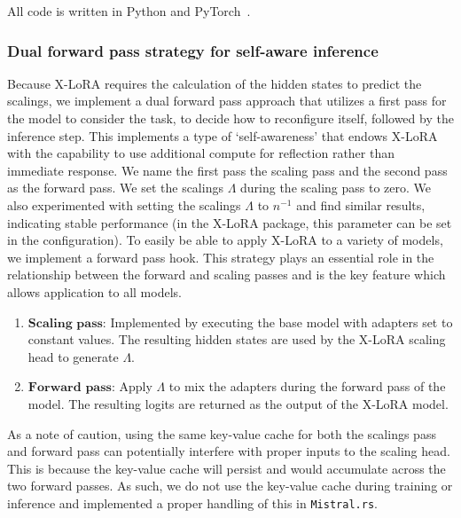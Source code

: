 \documentclass{article}
\begin{document}
All code is written in Python and PyTorch~\cite{Paszke2019PyTorchLibrary}. 


\subsubsection{Dual forward pass strategy for self-aware inference}
Because X-LoRA requires the calculation of the hidden states to predict the scalings, we implement a dual forward pass approach that utilizes a first pass for the model to consider the task, to decide how to reconfigure itself, followed by the inference step. This implements a type of `self-awareness' that endows X-LoRA with the capability to use additional compute for reflection rather than immediate response. 
%
We name the first pass the scaling pass and the second pass as the forward pass. We set the scalings $\Lambda$ during the scaling pass to zero. We  also experimented with setting the scalings $\Lambda$ to ${n}^{-1}$ and find similar results, indicating stable performance (in the X-LoRA package, this parameter can be set in the configuration). To easily be able to apply X-LoRA to a variety of models, we implement a forward pass hook. This strategy plays an essential role in the relationship between the forward and scaling passes and is the key feature which allows application to all models. 

\begin{enumerate}
    \item $\mathbf{Scaling}$ $\mathbf{pass}$: Implemented by executing the base model with adapters set to constant values. The resulting hidden states are used by the X-LoRA scaling head to generate $\Lambda$.
    \item $\mathbf{Forward}$ $\mathbf{pass}$: Apply $\Lambda$ to mix the adapters during the forward pass of the model. The resulting logits are returned as the output of the X-LoRA model.
\end{enumerate}

As a note of caution, using the same key-value cache for both the scalings pass and forward pass can potentially interfere with proper inputs to the scaling head. This is because the key-value cache will persist and would accumulate across the two forward passes. As such, we do not use the key-value cache during training or inference and implemented a proper handling of this in \texttt{Mistral.rs}.
\end{document}
